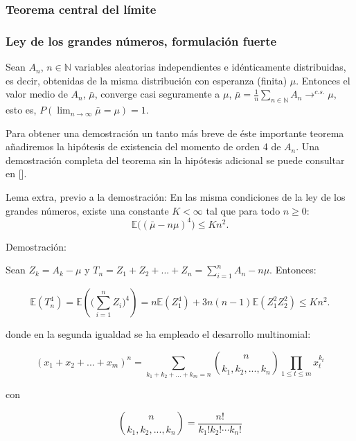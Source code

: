 \documentclass[../proyecto.tex]{memoir}
\begin{document}



\subsubsection{Teorema central del límite}




\subsubsection{Ley de los grandes números, formulación fuerte}

Sean $A_n$, $n \in \mathds{N}$ variables aleatorias independientes e idénticamente distribuidas, es decir, obtenidas de la misma distribución con esperanza (finita) $\mu$. Entonces el valor medio de $A_n$, $\bar{\mu}$, converge casi seguramente a $\mu$, $\bar{\mu}=\frac{1}{n}\sum_{n\in\mathds{N}} A_n \to^{c.s.} \mu$, esto es, $P(\lim_{n\to\infty} \bar{\mu}=\mu) = 1$.

Para obtener una demostración un tanto más breve de éste importante teorema añadiremos la hipótesis de existencia del momento de orden 4 de $A_n$. Una demostración completa del teorema sin la hipótesis adicional se puede consultar en [].

Lema extra, previo a la demostración:
En las misma condiciones de la ley de los grandes números, existe una constante $ K < \infty $ tal que para todo $ n \geq 0$:
$$
	\mathds{E} \big( ( \bar{ \mu } - n \mu ) ^ 4 \big) \leq K n^2.
$$

Demostración:

Sean $Z_k = A_k - \mu $ y $T_n = Z_1 + Z_2 + ... + Z_n = \sum_{i=1}^{n} A_n - n\mu $. Entonces:

$$
	\mathds{E} ( T_{n}^{4} ) = \mathds{E} ( \big( \sum_{i=1}^{n} Z_i \big) ^{4} ) = n\mathds{E}(Z_{1}^4)+3n(n-1)\mathds{E}(Z_1^2 Z_2^2) \leq Kn^2.
$$

donde en la segunda igualdad se ha empleado el desarrollo multinomial:

$$
(x_1+x_2+...+x_m)^n = \sum_{k_1+k_2+...+k_m=n} { n \choose k_1,k_2, ..., k_n} \prod_{1 \leq t \leq m} x_t^{k_t}
$$

con

$$
{ n \choose k_1,k_2, ..., k_n} = \frac{n!}{k_1!k_2! \dotsb k_n!}
$$
\end{document}
